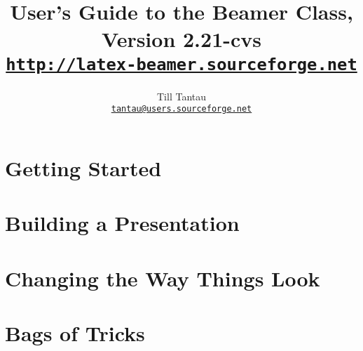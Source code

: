 \documentclass{ltxdoc}
\def\version{2.21-cvs}
\begin{document}
\title{User's Guide to the Beamer Class, Version \version\\
\Large\href{http://latex-beamer.sourceforge.net}{\texttt{http://latex-beamer.sourceforge.net}}}
\author{Till Tantau\\
  \href{mailto:tantau@users.sourceforge.net}{\texttt{tantau@users.sourceforge.net}}}

\maketitle

\tableofcontents

\part{Getting Started}




\part{Building a Presentation}






\part{Changing the Way Things Look}





\part{Bags of Tricks}


\end{document}
